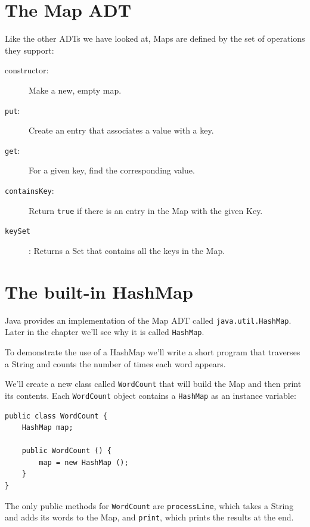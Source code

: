 \documentclass[12pt]{book}
\theoremstyle{exercise}
\begin{document}
\section {The Map ADT}
\label{map}

Like the other ADTs we have looked at, Maps are defined
by the set of operations they support:

\begin{description}

\item[constructor:] Make a new, empty map. 

\item[{\tt put}:]  Create an entry that associates a value with a key.

\item[{\tt get}:]  For a given key, find the corresponding value.

\item[{\tt containsKey}:]  Return {\tt true} if there
is an entry in the Map with the given Key.

\item[{\tt keySet}]: Returns a Set that contains all the keys
in the Map.

\end{description}


\section {The built-in HashMap}

Java provides an implementation of the Map ADT called
{\tt java.util.HashMap}.
Later in the chapter we'll see why it is called {\tt HashMap}.

To demonstrate the use of a HashMap we'll write
a short program that traverses a String and counts the number
of times each word appears.

We'll create a new class called {\tt WordCount} that will
build the Map and then print its contents.  Each
{\tt WordCount} object contains a {\tt HashMap} as an
instance variable:

\begin{verbatim}
public class WordCount {
    HashMap map;

    public WordCount () {
        map = new HashMap ();
    }
}
\end{verbatim}
%
The only public methods for {\tt WordCount} are {\tt processLine},
which takes a String and adds its words to the Map, and {\tt print},
which prints the results at the end.
\end{document}
